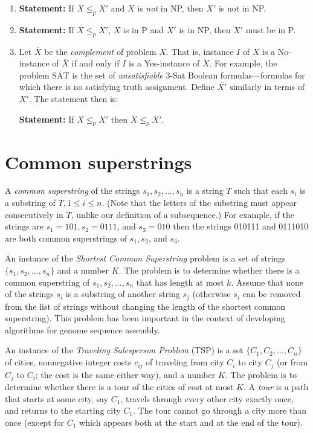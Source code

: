 \documentclass[11pt]{article}
\begin{document}
\begin{enumerate}
\item \textbf{Statement:}
   If $X \le_p X'$ and $X$ is \emph{not} in NP, then $X'$ is not in NP.

\item \textbf{Statement:}
If $X \le_p X'$, $X$ is in P and $X'$ is in NP, then $X'$ must be
in P.

\item Let
$\overline{X}$ be the \emph{complement} of problem $X$. That is,
instance $I$ of $X$ is a No-instance of $\overline{X}$ if and only
if $I$ is a Yes-instance of $X$. 
For example, the problem $\overline{\mbox{SAT}}$
is the set of \emph{unsatisfiable} 3-Sat Boolean formulas---formulas
for which there is no satisfying truth assignment.
Define $\overline{X'}$ similarly in terms of $X'$. The statement then is:

\textbf{Statement:} If $X \le_p X'$ then $\overline{X} \le_p \overline{X}'$.
\end{enumerate}

\section{Common superstrings}
\label{sec-3}
A \emph{common superstring} of the strings $s_1, s_2, \ldots, s_n$ is a
string $T$ such that each $s_i$ is a substring of $T, 1 \le i \le
n$. (Note that the letters of the substring must appear consecutively in
$T$, unlike our definition of a subsequence.) For example, if the
strings are $s_1 = 101, s_2 = 0111$, and $s_3 = 010$ then the strings
010111 and 0111010 are both common superstrings of $s_1, s_2$, and
$s_3$.  

An instance of the \emph{Shortest Common Superstring} problem is a set of
strings $\{s_1, s_2, \ldots, s_n\}$ and a number $K$.
The problem is to determine whether there is a
common superstring of $s_1, s_2, \ldots, s_n$ that has length at most
$k$.  Assume that none of the strings $s_i$ is a substring of another
string $s_j$ (otherwise $s_i$ can be removed from the list of strings
without changing the length of the shortest common superstring). This
problem has been important in the context of developing algorithms for
genome sequence assembly.

An instance of the \emph{Traveling Salesperson Problem} (TSP) is a set $\{
C_1, C_2, \ldots, C_n \}$ of cities, nonnegative integer costs
$c_{ij}$ of traveling from city $C_i$ to city $C_j$ (or from $C_j$ to
$C_i$; the cost is the same either way), and a number $K$.  The
problem is to determine whether there is a tour of the cities of cost
at most $K$.  A \emph{tour} is a path that starts at some city, say $C_1$,
travels through every other city exactly once, and returns to the
starting city $C_1$. The tour cannot go through a city more than once
(except for $C_1$ which appears both at the start and at the end of
the tour).
\end{document}
